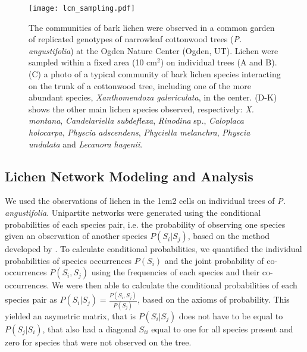 \documentclass[9pt,twocolumn,twoside,lineno]{pnas-new}
\begin{document}
{\begin{figure}[ht]
\centering
\texttt{[image: lcn\_sampling.pdf]}
\caption{The communities of bark lichen were observed in a common
  garden of replicated genotypes of narrowleaf cottonwood trees
  (\textit{P. angustifolia}) at the Ogden Nature Center (Ogden,
  UT). Lichen were sampled within a fixed area (10 cm$^2$) on
  individual trees (A and B). (C) a photo of a typical community of
  bark lichen species interacting on the trunk of a cottonwood tree,
  including one of the more abundant species, \textit{Xanthomendoza
    galericulata}, in the center. (D-K) shows the other main lichen
  species observed, respectively:  \textit{X. montana},
  \textit{Candelariella subdeflexa}, \textit{Rinodina} sp.,
  \textit{Caloplaca holocarpa}, \textit{Physcia adscendens},
  \textit{Phyciella melanchra}, \textit{Physcia undulata} and
  \textit{Lecanora hagenii}.}
\label{fig:lichen_sampling}
\end{figure}



\subsection*{Lichen Network Modeling and Analysis}

We used the observations of lichen in the 1cm2 cells on individual
trees of \textit{P. angustifolia}. Unipartite networks were generated
using the conditional probabilities of each species pair, i.e. the
probability of observing one species given an observation of another
species $P(S_i | S_j)$, based on the method developed by
\citep{Araujo2011}. To calculate conditional probabilities, we
quantified the individual probabilities of species occurrences
$P(S_i)$ and the joint probability of co-occurrences $P(S_i,S_j)$
using the frequencies of each species and their co-occurrences. We
were then able to calculate the conditional probabilities of each
species pair as $P(S_i|S_j) = \frac{P(S_i,S_j)}{P(S_j)}$, based on the
axioms of probability. This yielded an asymetric matrix, that is
$P(S_i|S_j)$ does not have to be equal to $P(S_j|S_i)$, that also had
a diagonal $S_{ii}$ equal to one for all species present and zero for
species that were not observed on the tree.

}
\end{document}
